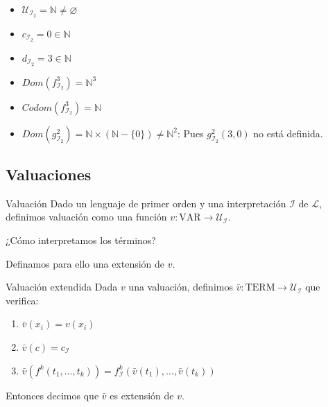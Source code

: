\begin{enumerate}
    \begin{itemize}[label=\cmark]
        \item $\mathcal{U}_{\mathcal{I}_2} = \mathbb{N} \neq \varnothing$
        \item  $c_{\mathcal{I}_2} = 0 \in \mathbb{N}$
        \item  $d_{\mathcal{I}_2} = 3 \in \mathbb{N}$
        \item  $Dom(f_{\mathcal{I}_2}^3) = \mathbb{N}^3$
        \item  $Codom(f_{\mathcal{I}_2}^3) = \mathbb{N}$
        \item[\xmark]  $Dom(g_{\mathcal{I}_2}^2) 
            = \mathbb{N} \times \left(\mathbb{N} - \{ 0 \}\right)
            \neq \mathbb{N}^2$: 
            Pues $g_{\mathcal{I}_2}^{2}(3,0)$ no está definida.
    \end{itemize}
\end{enumerate}

\subsection{Valuaciones}

\begin{definicion}{Valuación}{}
    Dado un lenguaje de primer orden y una interpretación $\mathcal{I}$ de
    $\mathcal{L}$, definimos valuación como una función 
    $v: \mathrm{VAR} \to \mathcal{U}_{\mathcal{I}}$.
\end{definicion}

\medskip

¿Cómo interpretamos los términos?

Definamos para ello una extensión de $v$.

\begin{definicion}{Valuación extendida}{}
    Dada $v$ una valuación, definimos
    $\bar{v}: \mathrm{TERM} \to \mathcal{U}_{\mathcal{I}}$ 
    que verifica:

    \begin{enumerate}
        \item $\bar{v} (x_i) = v(x_i)$ 
        \item $\bar{v}(c) = c_{\mathcal{I}}$ 
        \item $\bar{v}( f^{k}(t_1, \dotsc, t_k)) = 
            f_{\mathcal{I}}^{k}(\bar{v}(t_1), \dotsc, \bar{v}(t_k))$
    \end{enumerate}

    Entonces decimos que $\bar{v}$ es extensión de $v$.
\end{definicion}

